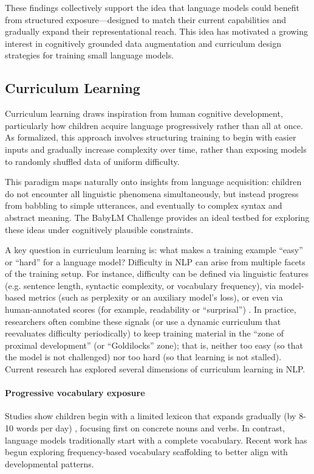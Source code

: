 These findings collectively support the idea that language models could benefit from structured exposure—designed to match their current capabilities and gradually expand their representational reach. This idea has motivated a growing interest in cognitively grounded data augmentation and curriculum design strategies for training small language models.

\subsection{Curriculum Learning}

Curriculum learning draws inspiration from human cognitive development, particularly how children acquire language progressively rather than all at once. As \citet{bengio2009curriculum} formalized, this approach involves structuring training to begin with easier inputs and gradually increase complexity over time, rather than exposing models to randomly shuffled data of uniform difficulty.

This paradigm maps naturally onto insights from language acquisition: children do not encounter all linguistic phenomena simultaneously, but instead progress from babbling to simple utterances, and eventually to complex syntax and abstract meaning. The BabyLM Challenge \citep{warstadt2023babylm1} provides an ideal testbed for exploring these ideas under cognitively plausible constraints.

A key question in curriculum learning is: what makes a training example “easy” or “hard” for a language model? Difficulty in NLP can arise from multiple facets of the training setup. For instance, difficulty can be defined via linguistic features (e.g. sentence length, syntactic complexity, or vocabulary frequency), via model-based metrics (such as perplexity or an auxiliary model's loss), or even via human-annotated scores (for example, readability or “surprisal”) \citep{soviany2022curriculum}. In practice, researchers often combine these signals (or use a dynamic curriculum that reevaluates difficulty periodically) to keep training material in the “zone of proximal development” (or “Goldilocks” zone); that is, neither too easy (so that the model is not challenged) nor too hard (so that learning is not stalled). Current research has explored several dimensions of curriculum learning in NLP.

\paragraph{Progressive vocabulary exposure} Studies show children begin with a limited lexicon that expands gradually (by 8-10 words per day) \citep{fenson1994variability, bergelson2015early, weizman2001lexical}, focusing first on concrete nouns and verbs. In contrast, language models traditionally start with a complete vocabulary. Recent work has begun exploring frequency-based vocabulary scaffolding \citep{soviany2022curriculum} to better align with developmental patterns.

